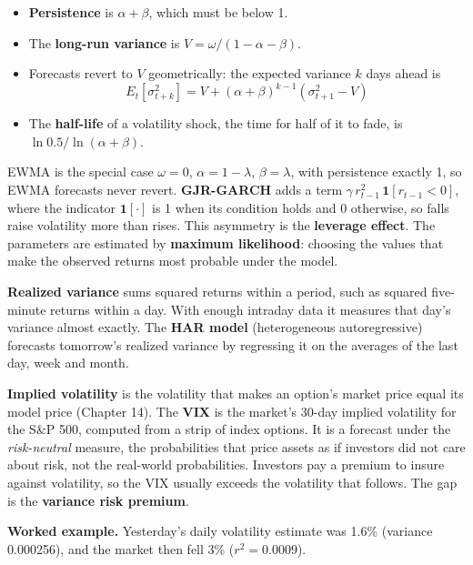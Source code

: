 \begin{itemize}
  \item \textbf{Persistence} is $\alpha + \beta$, which must be below 1.
  \item The \textbf{long-run variance} is $V = \omega / (1 - \alpha - \beta)$.
  \item Forecasts revert to $V$ geometrically: the expected variance $k$ days ahead is
  \begin{equation}
    E_t[\sigma^2_{t+k}] = V + (\alpha + \beta)^{k-1}\left(\sigma^2_{t+1} - V\right)
    \label{eq:11-forecast}
  \end{equation}
  \item The \textbf{half-life} of a volatility shock, the time for half of it to fade, is $\ln 0.5 / \ln(\alpha + \beta)$.
\end{itemize}

EWMA is the special case $\omega = 0$, $\alpha = 1 - \lambda$, $\beta = \lambda$, with persistence exactly 1, so EWMA forecasts never revert. \textbf{GJR-GARCH} adds a term $\gamma\,r^2_{t-1}\,\mathbf{1}[r_{t-1} < 0]$, where the indicator $\mathbf{1}[\cdot]$ is 1 when its condition holds and 0 otherwise, so falls raise volatility more than rises. This asymmetry is the \textbf{leverage effect}. The parameters are estimated by \textbf{maximum likelihood}: choosing the values that make the observed returns most probable under the model.

\textbf{Realized variance} sums squared returns within a period, such as squared five-minute returns within a day. With enough intraday data it measures that day's variance almost exactly. The \textbf{HAR model} (heterogeneous autoregressive) forecasts tomorrow's realized variance by regressing it on the averages of the last day, week and month.

\textbf{Implied volatility} is the volatility that makes an option's market price equal its model price (Chapter 14). The \textbf{VIX} is the market's 30-day implied volatility for the S\&P 500, computed from a strip of index options. It is a forecast under the \emph{risk-neutral} measure, the probabilities that price assets as if investors did not care about risk, not the real-world probabilities. Investors pay a premium to insure against volatility, so the VIX usually exceeds the volatility that follows. The gap is the \textbf{variance risk premium}.

\textbf{Worked example.} Yesterday's daily volatility estimate was 1.6\% (variance 0.000256), and the market then fell 3\% ($r^2 = 0.0009$).

